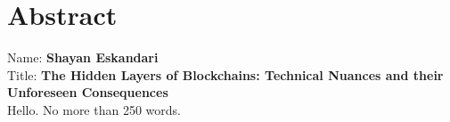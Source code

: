 
\chapter*{Abstract}

Name: 	\tab \textbf{Shayan Eskandari} \\
Title: 	\tab \textbf{The Hidden Layers of Blockchains: Technical Nuances and their Unforeseen Consequences}\\


Hello. No more than 250 words.





